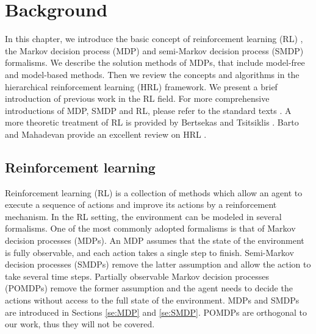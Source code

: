 \chapter{Background}
\label{ch:RL}

In this chapter, we introduce the basic concept of reinforcement learning (RL)
, the Markov decision process (MDP) and semi-Markov decision process (SMDP) formalisms. We describe the solution methods of MDPs, that include model-free and model-based 
methods. Then we review the concepts and algorithms in the hierarchical reinforcement learning (HRL) framework. 
We present a brief introduction of previous work in the RL field.
For more comprehensive introductions of MDP, SMDP and RL, please refer to the standard texts
\cite{Howard1960, Puterman94, SuttonIntro, KevinIntro}.
A more theoretic treatment of RL is provided by Bertsekas and Tsitsiklis \cite{Neurodynamic}.
Barto and Mahadevan provide an excellent review on HRL \cite{HRLSurvey}.

\section{Reinforcement learning}
\label{se:RL}
Reinforcement learning (RL) is a collection of methods which allow an agent to execute
a sequence of actions and improve its actions by a reinforcement mechanism.
In the RL setting, the environment can be modeled in several formalisms.
One of the most commonly adopted formalisms is that of Markov decision processes (MDPs).
An MDP assumes that the state of the environment is fully observable, and each action takes a single
step to finish. Semi-Markov decision processes (SMDPs) remove the latter assumption and allow
the action to take several time steps. Partially observable Markov decision processes (POMDPs) remove
the former assumption and the agent needs to decide the actions without access to the full state
of the environment.
MDPs and SMDPs are introduced in Sections \ref{se:MDP} and \ref{se:SMDP}.
POMDPs are orthogonal to our work, thus they will not be covered.


